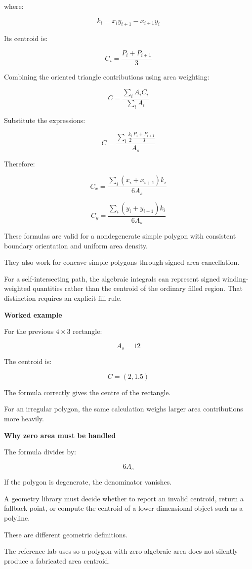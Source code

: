 where:

\[
k_i=x_iy_{i+1}-x_{i+1}y_i
\]

Its centroid is:

\[
C_i=\frac{P_i+P_{i+1}}3
\]

Combining the oriented triangle contributions using area weighting:

\[
C=\frac{\sum_i A_iC_i}{\sum_i A_i}
\]

Substitute the expressions:

\[
C= \frac{ \sum_i \frac{k_i}{2}\frac{P_i+P_{i+1}}3 }{ A_s }
\]

Therefore:

\[
\boxed{ C_x= \frac{ \sum_i(x_i+x_{i+1})k_i }{ 6A_s } }
\]

\[
\boxed{ C_y= \frac{ \sum_i(y_i+y_{i+1})k_i }{ 6A_s } }
\]

These formulas are valid for a nondegenerate simple polygon with consistent boundary orientation and uniform area density.

They also work for concave simple polygons through signed-area cancellation.

For a self-intersecting path, the algebraic integrals can represent signed winding-weighted quantities rather than the centroid of the ordinary filled region. That distinction requires an explicit fill rule.

\textbf{Worked example}

For the previous \(4\times3\) rectangle:

\[
A_s=12
\]

The centroid is:

\[
\boxed{C=(2,1.5)}
\]

The formula correctly gives the centre of the rectangle.

For an irregular polygon, the same calculation weighs larger area contributions more heavily.

\textbf{Why zero area must be handled}

The formula divides by:

\[
6A_s
\]

If the polygon is degenerate, the denominator vanishes.

A geometry library must decide whether to report an invalid centroid, return a fallback point, or compute the centroid of a lower-dimensional object such as a polyline.

These are different geometric definitions.

The reference lab uses  so a polygon with zero algebraic area does not silently produce a fabricated area centroid.

